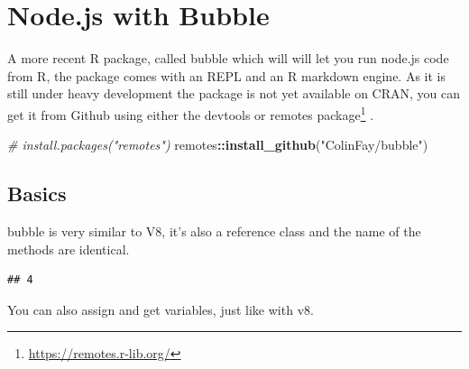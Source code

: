 \documentclass[
]{krantz}
\makeatletter
\newenvironment{Shaded}{\begin{snugshade}}{\end{snugshade}}
\newcommand{\CommentTok}[1]{\textcolor[rgb]{0.37,0.37,0.37}{\textit{#1}}}
\newcommand{\DecValTok}[1]{\textcolor[rgb]{0.06,0.06,0.06}{#1}}
\newcommand{\KeywordTok}[1]{\textcolor[rgb]{0.27,0.27,0.27}{\textbf{#1}}}
\newcommand{\NormalTok}[1]{#1}
\newcommand{\OperatorTok}[1]{\textcolor[rgb]{0.43,0.43,0.43}{\textbf{#1}}}
\newcommand{\StringTok}[1]{\textcolor[rgb]{0.5,0.5,0.5}{#1}}
\renewcommand{\href}[2]{#2\footnote{\url{#1}}}
\newenvironment{kframe}{%
\medskip{}
\setlength{\fboxsep}{.8em}
 \def\at@end@of@kframe{}%
 \ifinner\ifhmode%
  \def\at@end@of@kframe{\end{minipage}}%
  \begin{minipage}{\columnwidth}%
 \fi\fi%
 \def\FrameCommand##1{\hskip\@totalleftmargin \hskip-\fboxsep
 \colorbox{shadecolor}{##1}\hskip-\fboxsep
     \hskip-\linewidth \hskip-\@totalleftmargin \hskip\columnwidth}%
 \MakeFramed {\advance\hsize-\width
   \@totalleftmargin\z@ \linewidth\hsize
   \@setminipage}}%
 {\par\unskip\endMakeFramed%
 \at@end@of@kframe}
\renewenvironment{Shaded}{\begin{kframe}}{\end{kframe}}
\makeatother
\begin{document}
\hypertarget{node}{%
\chapter{Node.js with Bubble}\label{node}}

A more recent R package, called bubble which will will let you run node.js code from R, the package comes with an REPL and an R markdown engine. As it is still under heavy development the package is not yet available on CRAN, you can get it from Github using either the devtools or \href{https://remotes.r-lib.org/}{remotes package} \citep{R-remotes}.

\begin{Shaded}
\begin{Highlighting}[]
\CommentTok{\# install.packages("remotes")}
\NormalTok{remotes}\OperatorTok{::}\KeywordTok{install\_github}\NormalTok{(}\StringTok{"ColinFay/bubble"}\NormalTok{)}
\end{Highlighting}
\end{Shaded}

\hypertarget{basics-1}{%
\section*{Basics}\label{basics-1}}


bubble is very similar to V8, it's also a reference class and the name of the methods are identical.

\begin{Shaded}
\end{Shaded}

\begin{verbatim}
## 4
\end{verbatim}

You can also assign and get variables, just like with v8.

\begin{Shaded}
\end{Shaded}
\end{document}
